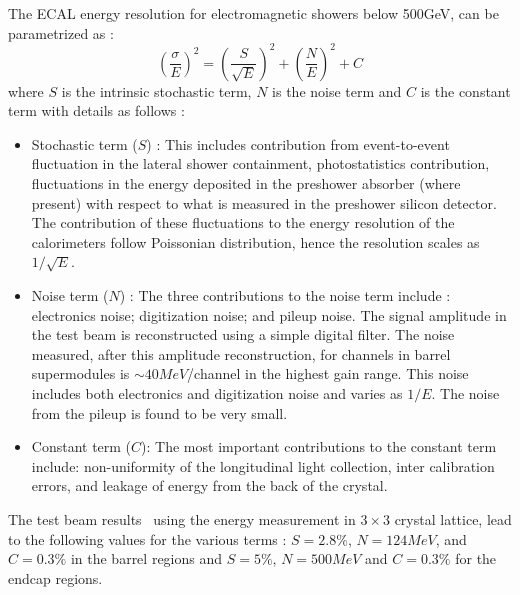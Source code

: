 The ECAL energy resolution for electromagnetic showers below 500\unit{GeV}, can be parametrized as :
\begin{equation}
\left(\frac{\sigma}{E}\right)^{2} = \left(\frac{S}{\sqrt{E}}\right)^{2} + \left(\frac{N}{E}\right)^{2} + C
\end{equation}
where $S$ is the intrinsic stochastic term, $N$ is the noise term and $C$ is the constant term with details as follows :
\begin{itemize}
\item Stochastic term ($S$) : This includes contribution from event-to-event fluctuation in the lateral shower containment, photostatistics
contribution, fluctuations in the energy deposited in the preshower absorber (where present) with respect to what is measured in the 
preshower silicon detector. The contribution of these fluctuations to the energy resolution of the calorimeters follow Poissonian distribution,
hence the resolution scales as $1/\sqrt{E}$.
\item Noise term ($N$) : The three contributions to the noise term include : electronics noise; digitization noise; and pileup noise. The signal 
amplitude in the test beam is reconstructed using a simple digital filter. The noise measured, after this amplitude reconstruction, for 
channels in barrel supermodules is $\sim40\unit{MeV}$/channel in the highest gain range. This noise includes both electronics and 
digitization noise and varies as $1/E$. The noise from the pileup is found to be very small.
\item Constant term ($C$): The most important contributions to the constant term include: non-uniformity of the longitudinal light collection,
 inter calibration errors, and leakage of energy from the back of the crystal. %
\end{itemize}
The test beam results~\cite{Chatrchyan:2008aa,CMS:2010zta} using the energy measurement in $3\times3$ crystal lattice, lead to the following values 
for the various terms : $S=2.8\%$, $N=124\unit{MeV}$, and $C=0.3\%$ in the barrel regions and $S=5\%$, $N=500\unit{MeV}$ and $C=0.3\%$ for the 
endcap regions.

